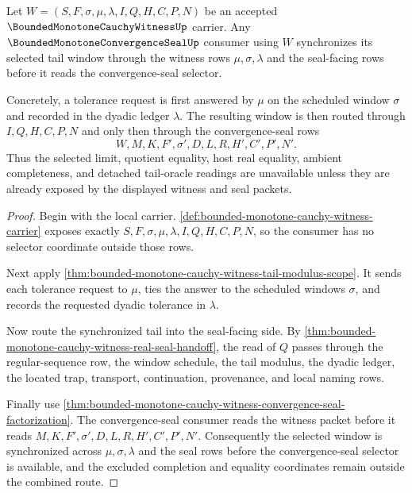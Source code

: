 \begin{theorem}
\label{thm:bounded-monotone-cauchy-witness-convergence-seal-selector-synchronization}
Let $W=(S,F,\sigma,\mu,\lambda,I,Q,H,C,P,N)$ be an accepted $\BoundedMonotoneCauchyWitnessUp$ carrier. Any $\BoundedMonotoneConvergenceSealUp$ consumer using $W$ synchronizes its selected tail window through the witness rows $\mu,\sigma,\lambda$ and the seal-facing rows before it reads the convergence-seal selector.

Concretely, a tolerance request is first answered by $\mu$ on the scheduled window $\sigma$ and recorded in the dyadic ledger $\lambda$. The resulting window is then routed through $I,Q,H,C,P,N$ and only then through the convergence-seal rows
$$
W,M,K,F',\sigma',D,L,R,H',C',P',N'.
$$
Thus the selected limit, quotient equality, host real equality, ambient completeness, and detached tail-oracle readings are unavailable unless they are already exposed by the displayed witness and seal packets.
\end{theorem}
\begin{proof}
Begin with the local carrier. \autoref{def:bounded-monotone-cauchy-witness-carrier} exposes exactly $S,F,\sigma,\mu,\lambda,I,Q,H,C,P,N$, so the consumer has no selector coordinate outside those rows.

Next apply \autoref{thm:bounded-monotone-cauchy-witness-tail-modulus-scope}. It sends each tolerance request to $\mu$, ties the answer to the scheduled windows $\sigma$, and records the requested dyadic tolerance in $\lambda$.

Now route the synchronized tail into the seal-facing side. By \autoref{thm:bounded-monotone-cauchy-witness-real-seal-handoff}, the read of $Q$ passes through the regular-sequence row, the window schedule, the tail modulus, the dyadic ledger, the located trap, transport, continuation, provenance, and local naming rows.

Finally use \autoref{thm:bounded-monotone-cauchy-witness-convergence-seal-factorization}. The convergence-seal consumer reads the witness packet before it reads $M,K,F',\sigma',D,L,R,H',C',P',N'$. Consequently the selected window is synchronized across $\mu,\sigma,\lambda$ and the seal rows before the convergence-seal selector is available, and the excluded completion and equality coordinates remain outside the combined route.
\end{proof}

